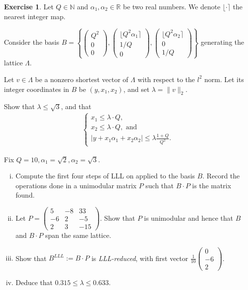 \documentclass[12pt,a4paper]{article}
\theoremstyle{plain}
\newtheorem*{Sol*}{Solution}
\theoremstyle{definition}
\newtheorem{Ex}{Exercise}
\def \N {\mathbb N}
\def \R {\mathbb R}
\newcommand{\nint}[1]{\ensuremath{\lfloor#1\rceil}}
\newif\ifsolutions
\newcommand{\exercise}[2]{
			\begin{Ex} #1 \end{Ex}
			\ifsolutions  \begin{Sol*} #2 \end{Sol*} \bigskip \else \bigskip  \fi
		}
\begin{document}
\exercise{
	Let $Q \in \N$ and $\alpha_1, \alpha_2 \in \R$ be two real numbers. We denote $\nint{ \cdot }$ the nearest integer map.

	Consider the basis $B = \left\{ \begin{pmatrix} Q^2 \\ 0 \\ 0 \end{pmatrix}, \begin{pmatrix} \nint{Q^2 \alpha_1} \\ 1/Q \\ 0 \end{pmatrix}, \begin{pmatrix} \nint{Q^2 \alpha_2} \\ 0 \\ 1/Q \end{pmatrix} \right\}$ generating the lattice $\Lambda$.
	
	Let  $v \in \Lambda$ be a nonzero shortest vector of $\Lambda$ with respect to the $l^2$ norm. 
	Let its integer coordinates in $B$ be $(y, x_1, x_2)$, and set $\lambda = \| v \|_2$.

	Show that $\lambda \leq \sqrt{3}$, and that
	\begin{align*}
	\begin{cases}
		x_1 \leq \lambda \cdot Q, \\
		x_2 \leq \lambda \cdot Q,  \text{ and }\\
		| y + x_1 \alpha_1 + x_2 \alpha_2 | \leq \lambda\frac{1+ Q}{Q^2}.
	\end{cases}
	\end{align*}
	
	Fix $Q=10, \alpha_1 = \sqrt{2}, \alpha_2 = \sqrt{3}$.
	\begin{enumerate}[i)]
		\item Compute the first four steps of LLL on applied to the basis $B$. 
		Record the operations done in a unimodular matrix $P$ such that $B \cdot P$ is the matrix found.
		\item Let $P = \begin{pmatrix} 5 & -8 & 33 \\
								-6 & 2 & -5 \\
								2 & 3 & -15 \end{pmatrix}.$
		Show that $P$ is unimodular and hence that $B$ and $B \cdot P$ span the same lattice.
		\item Show that $B^{LLL} := B \cdot P$ is \emph{LLL-reduced}, with first vector $\frac{1}{10}\begin{pmatrix} 0 \\ -6 \\ 2 \end{pmatrix}$.
		\item Deduce that $0.315 \leq \lambda \leq 0.633$.
	\end{enumerate}
}
{}
\end{document}
